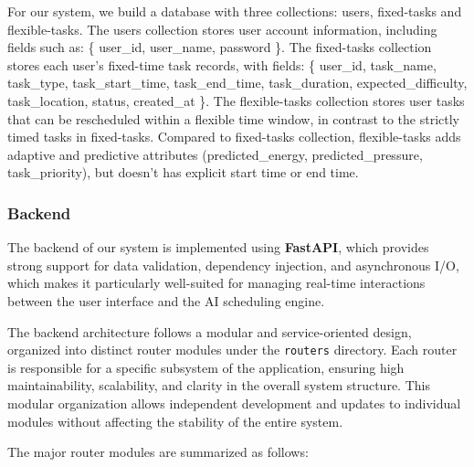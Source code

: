 \documentclass[12pt, a4paper]{article}
\begin{document}
            For our system, we build a database with three collections: users, fixed-tasks and flexible-tasks. The users collection stores user account information, including fields such as: \{ user\_id, user\_name, password \}. The fixed-tasks collection stores each user's fixed-time task records, with fields: \{ user\_id, task\_name, task\_type, task\_start\_time, task\_end\_time, task\_duration, expected\_difficulty, task\_location, status, created\_at \}. The flexible-tasks collection stores user tasks that can be rescheduled within a flexible time window, in contrast to the strictly timed tasks in fixed-tasks. Compared to fixed-tasks collection, flexible-tasks adds adaptive and predictive attributes (predicted\_energy, predicted\_pressure, task\_priority), but doesn't has explicit start time or end time. 

        \subsubsection{Backend}
        
            The backend of our system is implemented using \textbf{FastAPI}, which provides strong support for data validation, dependency injection, and asynchronous I/O, which makes it particularly well-suited for managing real-time interactions between the user interface and the AI scheduling engine.
            
            The backend architecture follows a modular and service-oriented design, organized into distinct router modules under the \texttt{routers} directory. Each router is responsible for a specific subsystem of the application, ensuring high maintainability, scalability, and clarity in the overall system structure. This modular organization allows independent development and updates to individual modules without affecting the stability of the entire system.
            
            The major router modules are summarized as follows:
            
\end{document}
